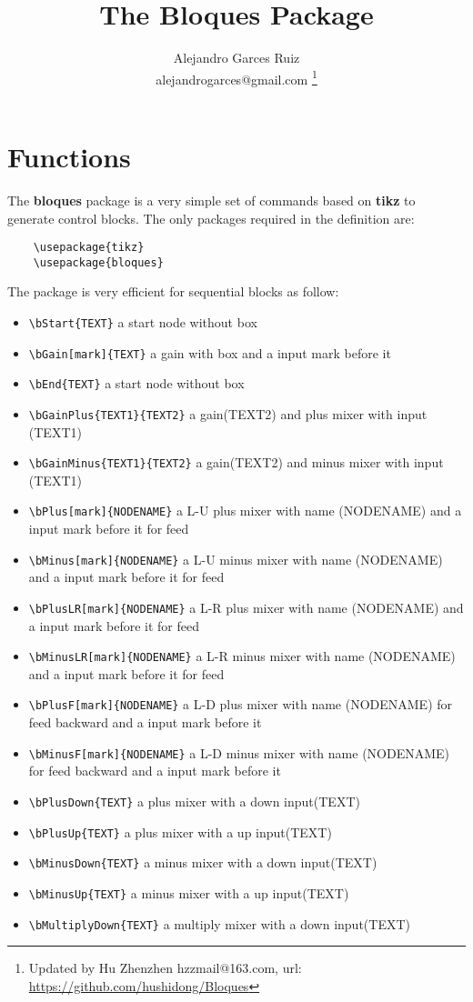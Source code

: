\documentclass[a4paper,onecolumn]{IEEETran}
\title{The Bloques Package}
\author{Alejandro Garces Ruiz \\ alejandrogarces@gmail.com
\footnote{Updated by Hu Zhenzhen hzzmail@163.com,
url: \url{https://github.com/hushidong/Bloques}}}
\begin{document}
\maketitle

\section{Functions}


The \textbf{bloques} package is a very simple set of commands based on \textbf{tikz} to generate control blocks.  The only packages required in the definition are:

\begin{verbatim}
	\usepackage{tikz}
	\usepackage{bloques}
\end{verbatim}

The package is very efficient for sequential blocks as follow:

\begin{itemize}
\item \verb|\bStart{TEXT}| a start node without box
\item \verb|\bGain[mark]{TEXT}| a gain with box and a input mark before it
\item \verb|\bEnd{TEXT}| a start node without box
\item \verb|\bGainPlus{TEXT1}{TEXT2}| a gain(TEXT2) and plus mixer with input (TEXT1)
\item \verb|\bGainMinus{TEXT1}{TEXT2}| a gain(TEXT2) and minus mixer with input (TEXT1)
\item \verb|\bPlus[mark]{NODENAME}| a L-U plus mixer with name (NODENAME) and a input mark before it for feed
\item \verb|\bMinus[mark]{NODENAME}| a L-U minus mixer with name (NODENAME) and a input mark before it for feed
\item \verb|\bPlusLR[mark]{NODENAME}| a L-R plus mixer with name (NODENAME) and a input mark before it for feed
\item \verb|\bMinusLR[mark]{NODENAME}| a L-R minus mixer with name (NODENAME) and a input mark before it for feed
\item \verb|\bPlusF[mark]{NODENAME}| a L-D plus mixer with name (NODENAME)  for feed backward and a input mark before it
\item \verb|\bMinusF[mark]{NODENAME}| a L-D minus mixer with name (NODENAME)  for feed backward and a input mark before it
\item \verb|\bPlusDown{TEXT}| a plus mixer with a down input(TEXT)
\item \verb|\bPlusUp{TEXT}|   a plus mixer with a up input(TEXT)
\item \verb|\bMinusDown{TEXT}| a minus mixer with a down input(TEXT)
\item \verb|\bMinusUp{TEXT}| a minus mixer with a up input(TEXT)
\item \verb|\bMultiplyDown{TEXT}| a multiply mixer with a down input(TEXT)
\end{itemize}
\end{document}

